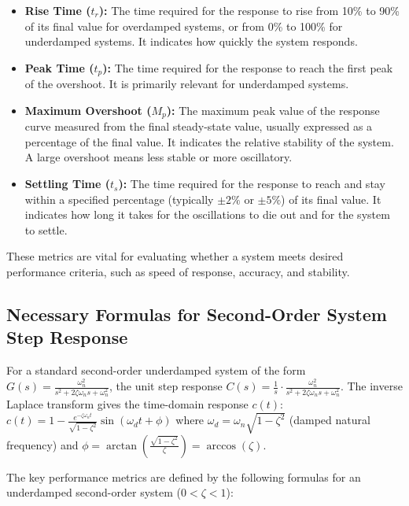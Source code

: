 \documentclass{article}
\begin{document}
	\begin{itemize}
		\item \textbf{Rise Time ($t_r$):} The time required for the response to rise from 10\% to 90\% of its final value for overdamped systems, or from 0\% to 100\% for underdamped systems. It indicates how quickly the system responds.
		\item \textbf{Peak Time ($t_p$):} The time required for the response to reach the first peak of the overshoot. It is primarily relevant for underdamped systems.
		\item \textbf{Maximum Overshoot ($M_p$):} The maximum peak value of the response curve measured from the final steady-state value, usually expressed as a percentage of the final value. It indicates the relative stability of the system. A large overshoot means less stable or more oscillatory.
		\item \textbf{Settling Time ($t_s$):} The time required for the response to reach and stay within a specified percentage (typically $\pm 2\%$ or $\pm 5\%$) of its final value. It indicates how long it takes for the oscillations to die out and for the system to settle.
	\end{itemize}
	
	These metrics are vital for evaluating whether a system meets desired performance criteria, such as speed of response, accuracy, and stability.
	
	\subsection*{Necessary Formulas for Second-Order System Step Response}
	
	For a standard second-order underdamped system of the form $G(s) = \frac{\omega_n^2}{s^2 + 2\zeta\omega_n s + \omega_n^2}$, the unit step response $C(s) = \frac{1}{s} \cdot \frac{\omega_n^2}{s^2 + 2\zeta\omega_n s + \omega_n^2}$. The inverse Laplace transform gives the time-domain response $c(t)$:
	$c(t) = 1 - \frac{e^{-\zeta\omega_n t}}{\sqrt{1-\zeta^2}} \sin(\omega_d t + \phi)$
	where $\omega_d = \omega_n \sqrt{1-\zeta^2}$ (damped natural frequency) and $\phi = \arctan\left(\frac{\sqrt{1-\zeta^2}}{\zeta}\right) = \arccos(\zeta)$.
	
	The key performance metrics are defined by the following formulas for an underdamped second-order system ($0 < \zeta < 1$):
	
\end{document}
